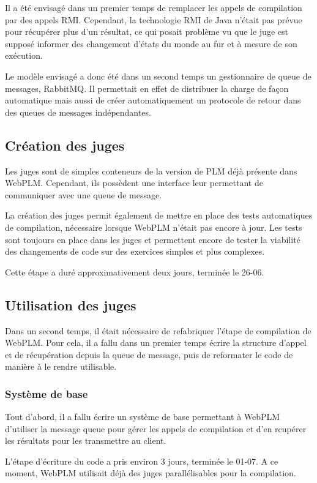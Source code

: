 \documentclass[stage]{tnreport}
\begin{document}
Il a été envisagé dans un premier temps de remplacer les appels de compilation par des appels RMI.
Cependant, la technologie RMI de Java n'était pas prévue pour récupérer plus d'un résultat, ce qui posait problème vu que le juge est supposé informer des changement d'états du monde au fur et à mesure de son exécution.

Le modèle envisagé a donc été dans un second temps un gestionnaire de queue de messages, RabbitMQ. Il permettait en effet de distribuer la charge de façon automatique mais aussi de créer automatiquement un protocole de retour dans des queues de messages indépendantes.

\subsection{Création des juges}

Les juges sont de simples conteneurs de la version de PLM déjà présente dans WebPLM. Cependant, ils possèdent une interface leur permettant de communiquer avec une queue de message.

La création des juges permit également de mettre en place des tests automatiques de compilation, nécessaire lorsque WebPLM n'était pas encore à jour. Les tests sont toujours en place dans les juges et permettent encore de tester la viabilité des changements de code sur des exercices simples et plus complexes.

Cette étape a duré approximativement deux jours, terminée le 26-06.

\subsection{Utilisation des juges}

Dans un second temps, il était nécessaire de refabriquer l'étape de compilation de WebPLM. Pour cela, il a fallu dans un premier temps écrire la structure d'appel et de récupération depuis la queue de message, puis de reformater le code de manière à le rendre utilisable.

\subsubsection{Système de base}
Tout d'abord, il a fallu écrire un système de base permettant à WebPLM d'utiliser la message queue pour gérer les appels de compilation et d'en rcupérer les résultats pour les transmettre au client.

L'étape d'écriture du code a pris environ 3 jours, terminée le 01-07. A ce moment, WebPLM utilisait déjà des juges parallélisables pour la compilation.
\end{document}

